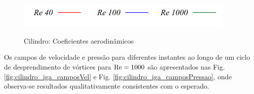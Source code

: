 \documentclass[tese_patricia]{subfiles}
\begin{document}
\begin{figure}[!htb]
	\centering
	  \\
	\\ 
	{\includegraphics[scale=1.3]{Imagens/Cap3/Legenda.pdf}}
	\caption{Cilindro: Coeficientes aerodinâmicos }
	\label{fig:cilindro_coeficientes3d}
\end{figure}

Os campos de velocidade e pressão para diferentes instantes ao longo de um ciclo de desprendimento de vórtices para $\mathrm{Re} = 1000$ são apresentados nas Fig. \ref{fig:cilindro_iga_camposVel} e Fig. \ref{fig:cilindro_iga_camposPressao}, onde observa-se resultados qualitativamente consistentes com o esperado.
\end{document}
